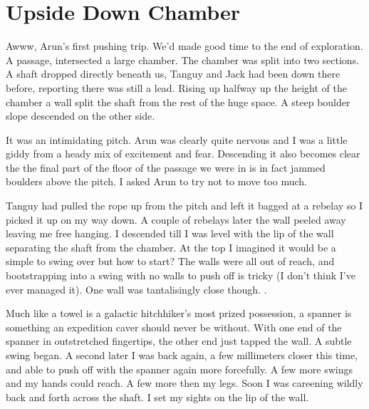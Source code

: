 \section{Upside Down Chamber}


Awww, Arun's first pushing trip. We'd made good time to the end of exploration. A passage,  intersected a large chamber. The chamber was split into two sections. A shaft dropped directly beneath us, Tanguy and Jack had been down there before, reporting there was still a lead. Rising up halfway up the height of the chamber a wall split the shaft from the rest of the huge space. A steep boulder slope descended on the other side.

It was an intimidating pitch. Arun was clearly quite nervous and I was a little giddy from a heady mix of excitement and fear. Descending it also becomes clear the the final part of the floor of the passage we were in is in fact jammed boulders above the pitch. I asked Arun to try not to move too much.

Tanguy had pulled the rope up from the pitch and left it bagged at a rebelay so I picked it up on my way down. A couple of rebelays later the wall peeled away leaving me free hanging. I descended till I was level with the lip of the wall separating the shaft from the chamber. At the top I imagined it would be a simple to swing over but how to start? The walls were all out of reach, and bootstrapping into a swing with no walls to push off is tricky (I don't think I've ever managed it). One wall was tantalisingly close though. .

Much like a towel is a galactic hitchhiker's most prized possession, a spanner is something an expedition caver should never be without. With one end of the spanner in outstretched fingertips, the other end just tapped the wall. A subtle swing began. A second later I was back again, a few millimeters closer this time, and able to push off with the spanner again more forcefully. A few more swings and my hands could reach. A few more then my legs. Soon I was careening wildly back and forth across the shaft. I set my sights on the lip of the wall. 

